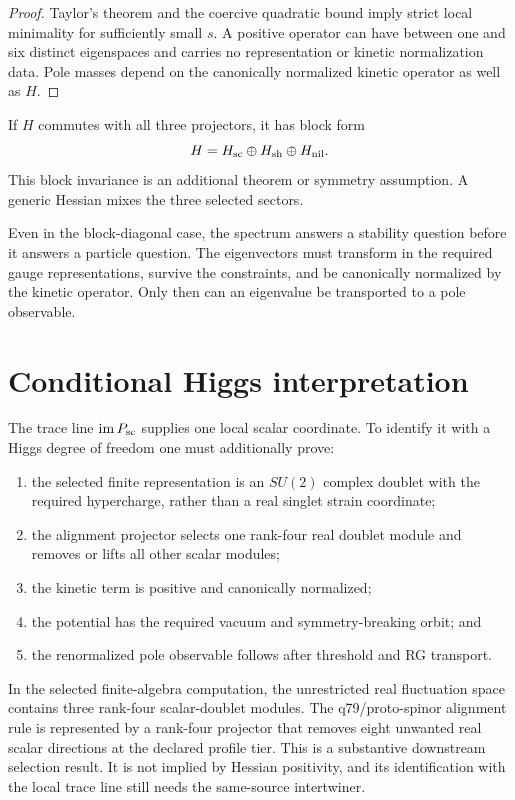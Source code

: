 \documentclass[11pt]{article}
\begin{document}
\begin{proof}
Taylor's theorem and the coercive quadratic bound imply strict local
minimality for sufficiently small $s$.  A positive operator can have between
one and six distinct eigenspaces and carries no representation or kinetic
normalization data.  Pole masses depend on the canonically normalized kinetic
operator as well as $H$.
\end{proof}

If $H$ commutes with all three projectors, it has block form
\[
 H=H_{\rm sc}\oplus H_{\rm sh}\oplus H_{\rm nil}.
\]
This block invariance is an additional theorem or symmetry assumption.  A
generic Hessian mixes the three selected sectors.

Even in the block-diagonal case, the spectrum answers a stability question
before it answers a particle question.  The eigenvectors must transform in
the required gauge representations, survive the constraints, and be
canonically normalized by the kinetic operator.  Only then can an eigenvalue
be transported to a pole observable.

\section{Conditional Higgs interpretation}

The trace line $\operatorname{im}P_{\rm sc}$ supplies one local scalar
coordinate.  To identify it with a Higgs degree of freedom one must additionally
prove:
\begin{enumerate}
\item the selected finite representation is an $SU(2)$ complex doublet with
the required hypercharge, rather than a real singlet strain coordinate;
\item the alignment projector selects one rank-four real doublet module and
removes or lifts all other scalar modules;
\item the kinetic term is positive and canonically normalized;
\item the potential has the required vacuum and symmetry-breaking orbit; and
\item the renormalized pole observable follows after threshold and RG
transport.
\end{enumerate}

In the selected finite-algebra computation, the unrestricted real fluctuation
space contains three rank-four scalar-doublet modules.  The q79/proto-spinor
alignment rule is represented by a rank-four projector that removes eight
unwanted real scalar directions at the declared profile tier.  This is a
substantive downstream selection result.  It is not implied by Hessian
positivity, and its identification with the local trace line still needs the
same-source intertwiner.
\end{document}
